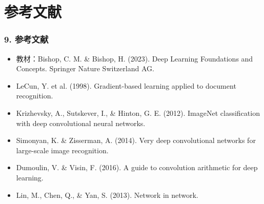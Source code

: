 \documentclass[t,aspectratio=169]{beamer} %
\begin{document}
\section{参考文献}

\begin{frame}
    \frametitle{9. 参考文献}
    \begin{itemize}
        \item 教材：Bishop, C. M. \& Bishop, H. (2023). Deep Learning Foundations and Concepts. Springer Nature Switzerland AG.
        \item LeCun, Y. et al. (1998). Gradient-based learning applied to document recognition.
        \item Krizhevsky, A., Sutskever, I., \& Hinton, G. E. (2012). ImageNet classification with deep convolutional neural networks.
        \item Simonyan, K. \& Zisserman, A. (2014). Very deep convolutional networks for large-scale image recognition.
        \item Dumoulin, V. \& Visin, F. (2016). A guide to convolution arithmetic for deep learning.
        \item Lin, M., Chen, Q., \& Yan, S. (2013). Network in network.
    \end{itemize}
\end{frame}
\end{document}

